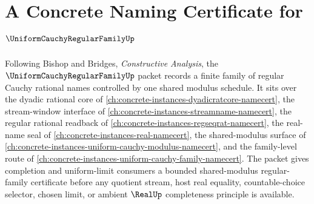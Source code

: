 \chapter{A Concrete Naming Certificate for $\UniformCauchyRegularFamilyUp$}
\label{ch:concrete-instances-uniform-cauchy-regular-family-namecert}

Following Bishop and Bridges, \emph{Constructive Analysis}, the $\UniformCauchyRegularFamilyUp$ packet records a finite family of regular Cauchy rational names controlled by one shared modulus schedule. It sits over the dyadic rational core of \autoref{ch:concrete-instances-dyadicratcore-namecert}, the stream-window interface of \autoref{ch:concrete-instances-streamname-namecert}, the regular rational readback of \autoref{ch:concrete-instances-regseqrat-namecert}, the real-name seal of \autoref{ch:concrete-instances-real-namecert}, the shared-modulus surface of \autoref{ch:concrete-instances-uniform-cauchy-modulus-namecert}, and the family-level route of \autoref{ch:concrete-instances-uniform-cauchy-family-namecert}. The packet gives completion and uniform-limit consumers a bounded shared-modulus regular-family certificate before any quotient stream, host real equality, countable-choice selector, chosen limit, or ambient $\RealUp$ completeness principle is available.

